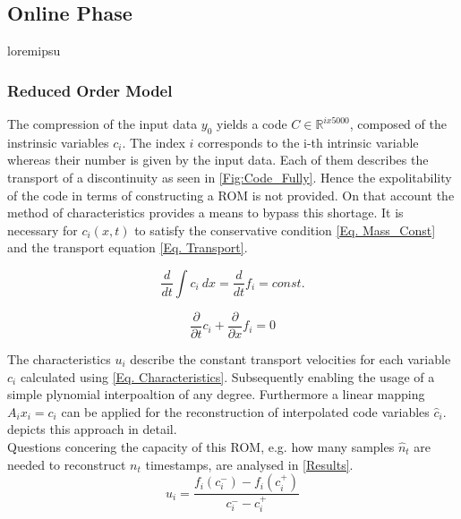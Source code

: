 \documentclass[12pt, a4paper]{article}
\begin{document}
\subsection{Online Phase}
loremipsu
\subsubsection{Reduced Order Model}\label{Reduced Order Model}
The compression of the input data $y_0$ yields a code $C \in \mathbb{R}^{ix5000}$, composed  of the instrinsic variables \(c_i\). The index \(i\) corresponds to the i-th intrinsic variable whereas their number is given by the input data. Each of them describes the transport of a discontinuity as seen in \cref{Fig:Code_Fully}. Hence the expolitability of the code in terms of constructing a ROM is not provided. On that account the method of characteristics \cite{Dret2016} provides a means to bypass this shortage. It is necessary for $c_i(x,t)$ to satisfy the conservative condition \cref{Eq. Mass_Const} and the transport equation \cref{Eq. Transport}.\\
\noindent\begin{minipage}{.5\linewidth}
	\begin{equation}
	\frac{d}{dt}\int c_i\ dx = \frac{d}{dt}f_i = const. \label{Eq. Mass_Const}
	\end{equation}
\end{minipage}%
\begin{minipage}{.5\linewidth}
	\begin{equation}
	\frac{\partial}{\partial t}c_i + \frac{\partial}{\partial x}f_i = 0 \label{Eq. Transport}
	\end{equation}
\end{minipage}
The characteristics $u_i$ describe the constant transport velocities for each variable $c_i$ calculated using \cref{Eq. Characteristics}. Subsequently enabling the usage of a simple plynomial interpoaltion of any degree. Furthermore a linear mapping \(A_ix_i=c_i\) can be applied for the reconstruction of interpolated code variables \(\hat{c}_i\).  depicts this approach in detail.\\
Questions concering the capacity of this ROM, e.g. how many samples \(\hat{n}_t\) are needed to reconstruct \(n_t\) timestamps, are analysed in \cref{Results}.
\begin{equation}
	u_i = \frac{f_i(c^-_i) - f_i(c^+_i)}{c^-_i - c^+_i}
	\label{Eq. Characteristics}
\end{equation}
\end{document}
